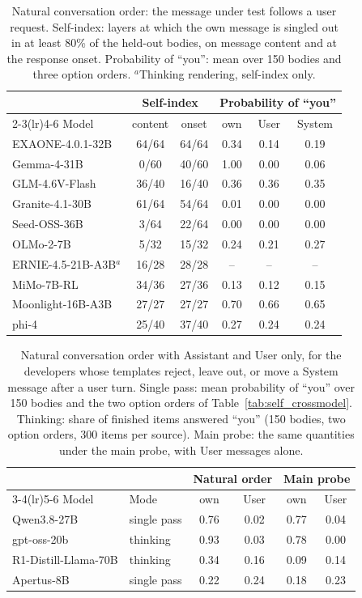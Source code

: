 \begin{table}[htbp]
\centering
\caption{Natural conversation order: the message under test follows a user request. Self-index: layers at which the own message is singled out in at least 80\% of the held-out bodies, on message content and at the response onset. Probability of ``you'': mean over 150 bodies and three option orders. $^{a}$Thinking rendering, self-index only.}
\label{tab:self_natural}
\footnotesize
\begin{tabular}{lccccc}
\toprule
& \multicolumn{2}{c}{Self-index} & \multicolumn{3}{c}{Probability of ``you''} \\
\cmidrule(lr){2-3}\cmidrule(lr){4-6}
Model & content & onset & own & User & System \\
\midrule
EXAONE-4.0.1-32B & 64/64 & 64/64 & 0.34 & 0.14 & 0.19 \\
Gemma-4-31B & 0/60 & 40/60 & 1.00 & 0.00 & 0.06 \\
GLM-4.6V-Flash & 36/40 & 16/40 & 0.36 & 0.36 & 0.35 \\
Granite-4.1-30B & 61/64 & 54/64 & 0.01 & 0.00 & 0.00 \\
Seed-OSS-36B & 3/64 & 22/64 & 0.00 & 0.00 & 0.00 \\
OLMo-2-7B & 5/32 & 15/32 & 0.24 & 0.21 & 0.27 \\
ERNIE-4.5-21B-A3B$^{a}$ & 16/28 & 28/28 & -- & -- & -- \\
MiMo-7B-RL & 34/36 & 27/36 & 0.13 & 0.12 & 0.15 \\
Moonlight-16B-A3B & 27/27 & 27/27 & 0.70 & 0.66 & 0.65 \\
phi-4 & 25/40 & 37/40 & 0.27 & 0.24 & 0.24 \\
\bottomrule
\end{tabular}
\end{table}

\begin{table}[htbp]
\centering
\caption{Natural conversation order with Assistant and User only, for the developers whose templates reject, leave out, or move a System message after a user turn. Single pass: mean probability of ``you'' over 150 bodies and the two option orders of Table~\ref{tab:self_crossmodel}. Thinking: share of finished items answered ``you'' (150 bodies, two option orders, 300 items per source). Main probe: the same quantities under the main probe, with User messages alone.}
\label{tab:self_natural2}
\footnotesize
\begin{tabular}{llcccc}
\toprule
& & \multicolumn{2}{c}{Natural order} & \multicolumn{2}{c}{Main probe} \\
\cmidrule(lr){3-4}\cmidrule(lr){5-6}
Model & Mode & own & User & own & User \\
\midrule
Qwen3.8-27B & single pass & 0.76 & 0.02 & 0.77 & 0.04 \\
gpt-oss-20b & thinking & 0.93 & 0.03 & 0.78 & 0.00 \\
R1-Distill-Llama-70B & thinking & 0.34 & 0.16 & 0.09 & 0.14 \\
Apertus-8B & single pass & 0.22 & 0.24 & 0.18 & 0.23 \\
\bottomrule
\end{tabular}
\end{table}

